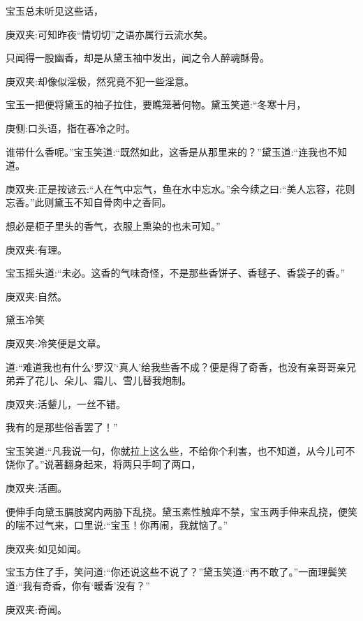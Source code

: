 \begin{parag}
    宝玉总未听见这些话，\begin{note}庚双夹:可知昨夜“情切切”之语亦属行云流水矣。\end{note}只闻得一股幽香，却是从黛玉袖中发出，闻之令人醉魂酥骨。\begin{note}庚双夹:却像似淫极，然究竟不犯一些淫意。\end{note}宝玉一把便将黛玉的袖子拉住，要瞧笼著何物。黛玉笑道:“冬寒十月，\begin{note}庚侧:口头语，指在春冷之时。\end{note}谁带什么香呢。”宝玉笑道:“既然如此，这香是从那里来的？”黛玉道:“连我也不知道。\begin{note}庚双夹:正是按谚云:“人在气中忘气，鱼在水中忘水。”余今续之曰:“美人忘容，花则忘香。”此则黛玉不知自骨肉中之香同。\end{note}想必是柜子里头的香气，衣服上熏染的也未可知。”\begin{note}庚双夹:有理。\end{note}宝玉摇头道:“未必。这香的气味奇怪，不是那些香饼子、香毬子、香袋子的香。”\begin{note}庚双夹:自然。\end{note}黛玉冷笑\begin{note}庚双夹:冷笑便是文章。\end{note}道:“难道我也有什么‘罗汉’‘真人’给我些香不成？便是得了奇香，也没有亲哥哥亲兄弟弄了花儿、朵儿、霜儿、雪儿替我炮制。\begin{note}庚双夹:活颦儿，一丝不错。\end{note}我有的是那些俗香罢了！”
\end{parag}


\begin{parag}
    宝玉笑道:“凡我说一句，你就拉上这么些，不给你个利害，也不知道，从今儿可不饶你了。”说著翻身起来，将两只手呵了两口，\begin{note}庚双夹:活画。\end{note}便伸手向黛玉膈肢窝内两胁下乱挠。黛玉素性触痒不禁，宝玉两手伸来乱挠，便笑的喘不过气来，口里说:“宝玉！你再闹，我就恼了。”\begin{note}庚双夹:如见如闻。\end{note}宝玉方住了手，笑问道:“你还说这些不说了？”黛玉笑道:“再不敢了。”一面理鬓笑道:“我有奇香，你有‘暖香’没有？”\begin{note}庚双夹:奇闻。\end{note}
\end{parag}


